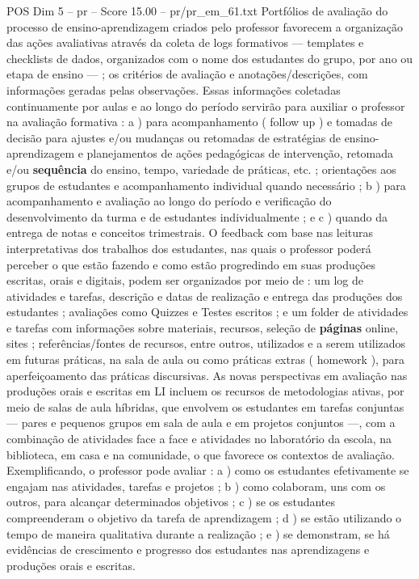 \begin{textsample}{POS Dim 5 – pr – Score 15.00 – pr/pr\_em\_61.txt}
Portfólios de avaliação do processo de ensino-aprendizagem criados pelo professor favorecem a organização das ações avaliativas através da coleta de logs formativos — templates e checklists de dados, organizados com o nome dos estudantes do grupo, por ano ou etapa de ensino — ; os critérios de avaliação e anotações/descrições, com informações geradas pelas observações.
Essas informações coletadas continuamente por aulas e ao longo do período servirão para auxiliar o professor na avaliação formativa : a ) para acompanhamento ( follow up ) e tomadas de decisão para ajustes e/ou mudanças ou retomadas de estratégias de ensino-aprendizagem e planejamentos de ações pedagógicas de intervenção, retomada e/ou \textbf{sequência} do ensino, tempo, variedade de práticas, etc. ; orientações aos grupos de estudantes e acompanhamento individual quando necessário ; b ) para acompanhamento e avaliação ao longo do período e verificação do desenvolvimento da turma e de estudantes individualmente ; e c ) quando da entrega de notas e conceitos trimestrais.
O feedback com base nas leituras interpretativas dos trabalhos dos estudantes, nas quais o professor poderá perceber o que estão fazendo e como estão progredindo em suas produções escritas, orais e digitais, podem ser organizados por meio de : um log de atividades e tarefas, descrição e datas de realização e entrega das produções dos estudantes ; avaliações como Quizzes e Testes escritos ; e um folder de atividades e tarefas com informações sobre materiais, recursos, seleção de \textbf{páginas} online, sites ; referências/fontes de recursos, entre outros, utilizados e a serem utilizados em futuras práticas, na sala de aula ou como práticas extras ( homework ), para aperfeiçoamento das práticas discursivas.
As novas perspectivas em avaliação nas produções orais e escritas em LI incluem os recursos de metodologias ativas, por meio de salas de aula híbridas, que envolvem os estudantes em tarefas conjuntas — pares e pequenos grupos em sala de aula e em projetos conjuntos —, com a combinação de atividades face a face e atividades no laboratório da escola, na biblioteca, em casa e na comunidade, o que favorece os contextos de avaliação.
Exemplificando, o professor pode avaliar : a ) como os estudantes efetivamente se engajam nas atividades, tarefas e projetos ; b ) como colaboram, uns com os outros, para alcançar determinados objetivos ; c ) se os estudantes compreenderam o objetivo da tarefa de aprendizagem ; d ) se estão utilizando o tempo de maneira qualitativa durante a realização ; e ) se demonstram, se há evidências de crescimento e progresso dos estudantes nas aprendizagens e produções orais e escritas.

\end{textsample}
